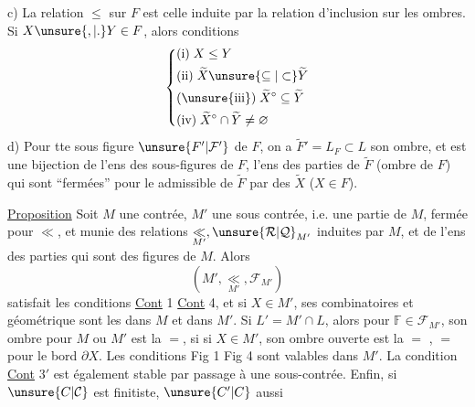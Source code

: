 c)  La relation $\leq$ sur $F$ est celle induite par la relation d'inclusion sur les ombres. Si $X\unsure{,|.}Y\in F$, alors conditions 
\[
\left\{\begin{aligned}
&\text{(i)}\;X\leq Y\\
&\text{(ii)}\;\widetilde X\unsure{\subseteq|\subset}\widetilde Y\\
&\text{(\unsure{iii})}\;\widetilde X^\circ\subseteq\widetilde Y\\
&\text{(iv)}\;\widetilde X^\circ\cap\widetilde Y\neq\varnothing
\end{aligned}\right.
\]
d)  Pour tte sous figure $\unsure{F'|\mathcal F'}$ de $F$, on a  $\widetilde F'=L_F\subset L$ son ombre, et
est une bijection de l'ens des sous-figures de $F$,  l'ens des parties de $\widetilde F$ (ombre de $F$) qui sont ``fermées'' pour le  admissible de $\widetilde F$ par  des $\widetilde X$ ($X\in F$).

\uline{Proposition} Soit $M$ une contrée, $M'$ une sous contrée,  i.e. une partie de $M$, fermée pour $\ll$, et munie des relations $\underset{M'}{\ll},\unsure{\mathcal R|\mathcal Q}_{M'}$ induites par $M$, et de l'ens  des parties   qui sont des figures de $M$. Alors
\[
(M',\underset{M'}{\ll},\mathcal F_{M'})
\]
satisfait les conditions \uline{Cont} 1  \uline{Cont} 4, et si $X\in M'$, ses  combinatoires et géométrique sont les  dans $M$ et dans $M'$. Si $L'=M'\cap L$, alors pour  $\mathbb F\in\mathcal F_{M'}$, son ombre  pour $M$ ou $M'$ est la $=$, si si $X\in M'$,  son ombre ouverte est la $=$ ,  $=$ pour le bord $\partial X$. Les conditions Fig 1  Fig 4 sont valables dans $M'$. La condition \uline{Cont} $3'$  est
également stable par passage à une sous-contrée. Enfin, si $\unsure{C|\mathcal C}$ est finitiste, $\unsure{C'|C}$ aussi

